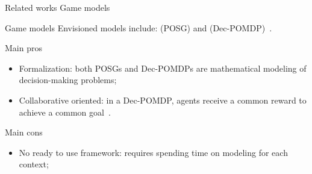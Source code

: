 	\begin{frame}{Related works}
		{Game models}

            \begin{block}{Game models}
                Envisioned  models include:  (POSG) and  (Dec-POMDP)~\cite{beynier2010}.

            \end{block}

            \begin{prosblock}{Main pros}
                \begin{itemize}
                    \item Formalization: both POSGs and Dec-POMDPs are mathematical modeling of decision-making problems;
                    \item Collaborative oriented: in a Dec-POMDP, agents receive a common reward to achieve a common goal~\cite{bernstein2013}.
                \end{itemize}
            \end{prosblock}

            \begin{consblock}{Main cons}
                \begin{itemize}
                    \item No ready to use framework: requires spending time on modeling for each context;
                \end{itemize}
            \end{consblock}

	\end{frame}

